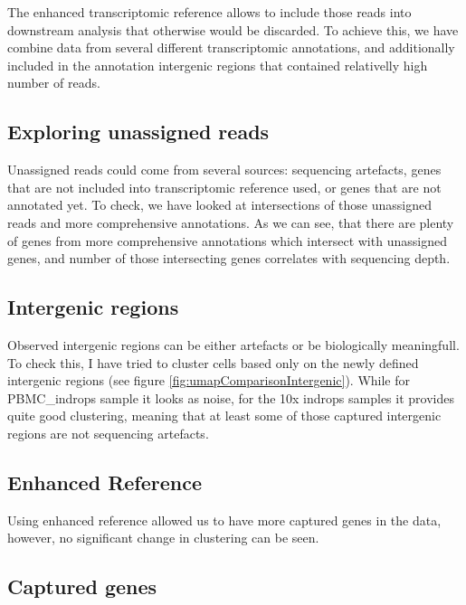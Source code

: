 The enhanced transcriptomic reference allows to include those reads into downstream analysis that otherwise would be discarded.
To achieve this, we have combine data from several different transcriptomic annotations,
and additionally included in the annotation intergenic regions that contained relativelly high number of reads.



\subsection{Exploring unassigned reads}
Unassigned reads could come from several sources:
sequencing artefacts, genes that are not included into transcriptomic reference used, or genes that are not annotated yet.
To check, we have looked at intersections of those unassigned reads and more comprehensive annotations.
As we can see, that there are plenty of genes from more comprehensive annotations which intersect with unassigned genes,
and number of those intersecting genes correlates with sequencing depth.



\subsection{Intergenic regions}

Observed intergenic regions can be either artefacts or be biologically meaningfull.
To check this, I have tried to cluster cells based only on the newly defined intergenic regions (see figure \ref{fig:umapComparisonIntergenic}).
While for PBMC\_indrops sample it looks as noise, for the 10x indrops samples it provides quite good clustering,
meaning that at least some of those captured intergenic regions are not sequencing artefacts.

\subsection{Enhanced Reference}

Using enhanced reference allowed us to have more captured genes in the data,
however, no significant change in clustering can be seen.



\subsection{Captured genes}

\fi
